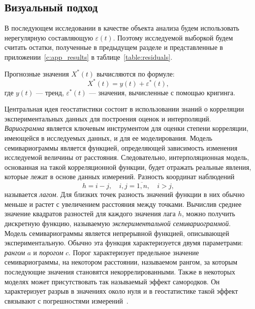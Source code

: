 \subsection{Визуальный подход} %
\label{sec:_variogram}
В последующем исследовании в качестве объекта анализа будем использовать нерегулярную составляющую $ \varepsilon(t) $. Поэтому исследуемой выборкой будем считать остатки, полученные в предыдущем разделе и представленные в приложении~\ref{c:app_results} в таблице~\ref{table:residuals}.

Прогнозные значения $ X^{*}(t) $ вычисляются по формуле:
\begin{equation*}
	X^{*}(t) = y(t) + \varepsilon^{*}(t),
\end{equation*}
где $ y(t) $ --- тренд, $ \varepsilon^{*}(t) $ --- значения, вычисленные с помощью кригинга.

Центральная идея геостатистики состоит в использовании знаний о корреляции экспериментальных данных для построения оценок и интерполяций. \textit{Вариограмма} является ключевым инструментом для оценки степени корреляции, имеющейся в исследуемых данных, и для ее моделирования. Модель семивариограммы является функцией, определяющей зависимость изменения исследуемой величины от расстояния. Следовательно, интерполяционная модель, основанная на такой корреляционной функции, будет отражать реальные явления, которые лежат в основе данных измерений. Разность координат наблюдений
\begin{equation*}
	h = i - j, \quad i, j = \overline{1,n}, \quad i > j,
\end{equation*}
называется \textit{лагом}. Для близких точек разность значений функции в них обычно меньше и растет с увеличением расстояния между точками. Вычислив среднее значение квадратов разностей для каждого значения лага $h$, можно получить дискретную функцию, называемую \textit{экспериментальной семивариограммой}. Модель семивариограммы является непрерывной функцией, описывающей экспериментальную. Обычно эта функция характеризуется двумя параметрами: \textit{рангом} $ a $ и \textit{порогом} $ c $. Порог характеризует предельное значение семивариограммы, на некотором расстоянии, называемом рангом, за которым последующие значения становятся некоррелированными. Также в некоторых моделях может присутствовать так называемый эффект самородков. Он характеризует разрыв в значениях около нуля и в геостатистике такой эффект связывают с погрешностями измерений~\cite{saveliev2012}.

